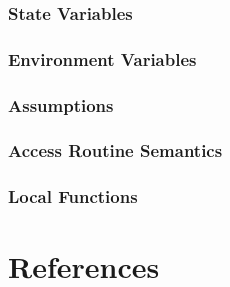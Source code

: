\documentclass{article}
\begin{document}
\subsubsection{State Variables}

\subsubsection{Environment Variables}

\subsubsection{Assumptions}

\subsubsection{Access Routine Semantics}

\subsubsection{Local Functions}

\section{References}
\end{document}
